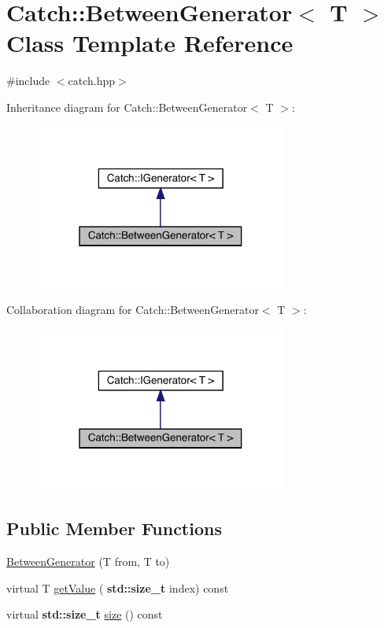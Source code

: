 \hypertarget{class_catch_1_1_between_generator}{}\section{Catch\+:\+:Between\+Generator$<$ T $>$ Class Template Reference}
\label{class_catch_1_1_between_generator}


{\ttfamily \#include $<$catch.\+hpp$>$}



Inheritance diagram for Catch\+:\+:Between\+Generator$<$ T $>$\+:
\nopagebreak
\begin{figure}[H]
\begin{center}
\leavevmode
\includegraphics[width=235pt]{class_catch_1_1_between_generator__inherit__graph}
\end{center}
\end{figure}


Collaboration diagram for Catch\+:\+:Between\+Generator$<$ T $>$\+:
\nopagebreak
\begin{figure}[H]
\begin{center}
\leavevmode
\includegraphics[width=235pt]{class_catch_1_1_between_generator__coll__graph}
\end{center}
\end{figure}
\subsection*{Public Member Functions}
\begin{DoxyCompactItemize}
\item 
\hyperlink{class_catch_1_1_between_generator_a835a057d691ae37caef660624099b51c}{Between\+Generator} (T from, T to)
\item 
virtual T \hyperlink{class_catch_1_1_between_generator_a913f74bb0c23b3bc0127abfffdabbd94}{get\+Value} (\textbf{ std\+::size\+\_\+t} index) const
\item 
virtual \textbf{ std\+::size\+\_\+t} \hyperlink{class_catch_1_1_between_generator_af65a1fe51f9b1106fc676e3dd189adb6}{size} () const
\end{DoxyCompactItemize}


